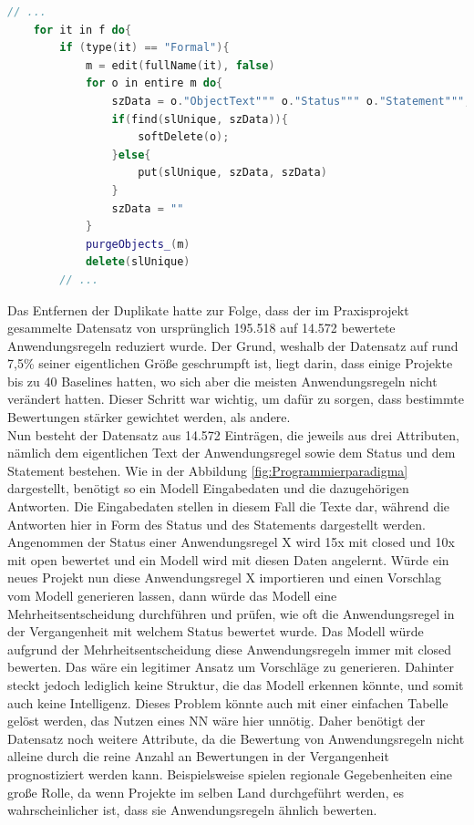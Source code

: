 \begin{lstlisting}[language = C++, caption={Duplikate in Modulen löschen},captionpos=b, label = lst:deleteDuplicates, float, floatplacement=H]
    // ...
    for it in f do{
        if (type(it) == "Formal"){
            m = edit(fullName(it), false)
            for o in entire m do{
                szData = o."ObjectText""" o."Status""" o."Statement""";
                if(find(slUnique, szData)){
                    softDelete(o);
                }else{
                    put(slUnique, szData, szData)
                }
                szData = "" 
            }
            purgeObjects_(m)
            delete(slUnique)
        // ...
\end{lstlisting}

Das Entfernen der Duplikate hatte zur Folge, dass der im Praxisprojekt gesammelte Datensatz von ursprünglich 195.518 auf 14.572 bewertete Anwendungsregeln reduziert wurde.
Der Grund, weshalb der Datensatz auf rund 7,5\% seiner eigentlichen Größe geschrumpft ist, liegt darin, dass einige Projekte bis zu 40 Baselines hatten, 
wo sich aber die meisten Anwendungsregeln nicht verändert hatten. Dieser Schritt war wichtig, um dafür zu sorgen, dass bestimmte Bewertungen stärker gewichtet werden,
als andere. \\

Nun besteht der Datensatz aus 14.572 Einträgen, die jeweils aus drei Attributen, nämlich dem eigentlichen Text der Anwendungsregel sowie dem Status und dem Statement bestehen.
Wie in der Abbildung \ref{fig:Programmierparadigma} dargestellt, benötigt so ein Modell Eingabedaten und die dazugehörigen Antworten. Die Eingabedaten stellen in diesem Fall
die Texte dar, während die Antworten hier in Form des Status und des Statements dargestellt werden. Angenommen der Status einer Anwendungsregel X wird 15x mit closed
und 10x mit open bewertet und ein Modell wird mit diesen Daten angelernt. Würde ein neues Projekt nun diese Anwendungsregel X importieren und einen Vorschlag vom Modell
generieren lassen, dann würde das Modell eine Mehrheitsentscheidung durchführen und prüfen, wie oft die Anwendungsregel in der Vergangenheit mit welchem Status bewertet wurde.
Das Modell würde aufgrund der Mehrheitsentscheidung diese Anwendungsregeln immer mit closed bewerten. Das wäre ein legitimer Ansatz um Vorschläge zu generieren. 
Dahinter steckt jedoch lediglich keine Struktur, die das Modell erkennen könnte, und somit auch keine Intelligenz. Dieses Problem könnte auch mit einer einfachen Tabelle 
gelöst werden, das Nutzen eines \ac{NN} wäre hier unnötig. Daher benötigt der Datensatz noch weitere Attribute, da die Bewertung von Anwendungsregeln nicht alleine durch die 
reine Anzahl an Bewertungen in der Vergangenheit prognostiziert werden kann. Beispielsweise spielen regionale Gegebenheiten eine große Rolle, 
da wenn Projekte im selben Land durchgeführt werden, es wahrscheinlicher ist, dass sie Anwendungsregeln ähnlich bewerten. 

